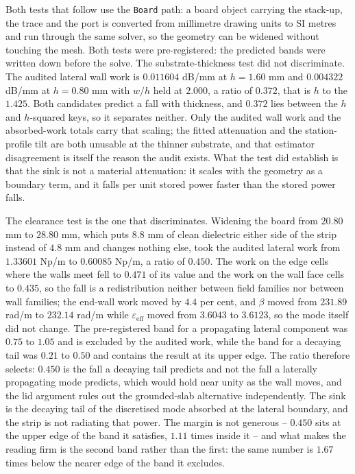 Both tests that follow use the \texttt{Board} path: a board object carrying the stack-up, the trace and the port
is converted from millimetre drawing units to SI metres and run through the same solver, so the geometry can be
widened without touching the mesh. Both tests were pre-registered: the predicted bands were written down before
the solve. The substrate-thickness test did not discriminate. The audited lateral wall work is $0.011604$ dB/mm
at $h = 1.60$ mm and $0.004322$ dB/mm at $h = 0.80$ mm with $w/h$ held at $2.000$, a ratio of $0.372$, that is
$h$ to the $1.425$. Both candidates predict a fall with thickness, and $0.372$ lies between the $h$ and
$h$-squared keys, so it separates neither. Only the audited wall work and the absorbed-work totals carry that
scaling; the fitted attenuation and the station-profile tilt are both unusable at the thinner substrate, and that
estimator disagreement is itself the reason the audit exists. What the test did establish is that the sink is not a
material attenuation: it scales with the geometry as a boundary term, and it falls per unit stored power faster
than the stored power falls.

The clearance test is the one that discriminates. Widening the board from $20.80$ mm to $28.80$ mm, which puts
$8.8$ mm of clean dielectric either side of the strip instead of $4.8$ mm and changes nothing else, took the
audited lateral work from $1.33601$ Np/m to $0.60085$ Np/m, a ratio of $0.450$. The work on the edge cells where
the walls meet fell to $0.471$ of its value and the work on the wall face cells to $0.435$, so the fall is a
redistribution neither between field families nor between wall families; the end-wall work moved by $4.4$ per
cent, and $\beta$ moved from $231.89$ rad/m to $232.14$ rad/m while $\varepsilon_{\mathrm{eff}}$ moved from
$3.6043$ to $3.6123$, so the mode itself did not change. The pre-registered band for a propagating lateral
component was $0.75$ to $1.05$ and is excluded by the audited work, while the band for a decaying tail was
$0.21$ to $0.50$ and contains the result at its upper edge. The ratio therefore selects: $0.450$ is the fall a
decaying tail predicts and not the fall a laterally propagating mode predicts, which would hold near unity as the
wall moves, and the lid argument rules out the grounded-slab alternative independently. The sink is the decaying
tail of the discretised mode absorbed at the lateral boundary, and the strip is not radiating that power. The
margin is not generous -- $0.450$ sits at the upper edge of the band it satisfies, $1.11$ times inside it -- and
what makes the reading firm is the second band rather than the first: the same number is $1.67$ times below the
nearer edge of the band it excludes.

